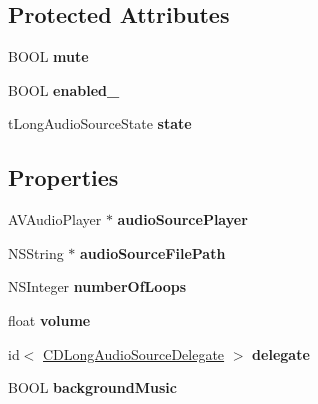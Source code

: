 \subsection*{Protected Attributes}
\begin{DoxyCompactItemize}
\item 
\hypertarget{interface_c_d_long_audio_source_a3402e241a03e28234bb22bb6ab6aad87}{B\-O\-O\-L {\bfseries mute}}\label{interface_c_d_long_audio_source_a3402e241a03e28234bb22bb6ab6aad87}

\item 
\hypertarget{interface_c_d_long_audio_source_af7bd033921e1c38c24c767ced5f4ca3e}{B\-O\-O\-L {\bfseries enabled\-\_\-}}\label{interface_c_d_long_audio_source_af7bd033921e1c38c24c767ced5f4ca3e}

\item 
\hypertarget{interface_c_d_long_audio_source_a40c0707fa345c90af619984ad6262f0c}{t\-Long\-Audio\-Source\-State {\bfseries state}}\label{interface_c_d_long_audio_source_a40c0707fa345c90af619984ad6262f0c}

\end{DoxyCompactItemize}
\subsection*{Properties}
\begin{DoxyCompactItemize}
\item 
\hypertarget{interface_c_d_long_audio_source_a286b94077fd473f116bece1d84189c80}{A\-V\-Audio\-Player $\ast$ {\bfseries audio\-Source\-Player}}\label{interface_c_d_long_audio_source_a286b94077fd473f116bece1d84189c80}

\item 
\hypertarget{interface_c_d_long_audio_source_a04f4635df6e90a7f2f3b7a571a9c43cf}{N\-S\-String $\ast$ {\bfseries audio\-Source\-File\-Path}}\label{interface_c_d_long_audio_source_a04f4635df6e90a7f2f3b7a571a9c43cf}

\item 
\hypertarget{interface_c_d_long_audio_source_a46736092910939328b9b4aabb43b25a5}{N\-S\-Integer {\bfseries number\-Of\-Loops}}\label{interface_c_d_long_audio_source_a46736092910939328b9b4aabb43b25a5}

\item 
\hypertarget{interface_c_d_long_audio_source_a4fb558153e158b558e9e32072dfb246b}{float {\bfseries volume}}\label{interface_c_d_long_audio_source_a4fb558153e158b558e9e32072dfb246b}

\item 
\hypertarget{interface_c_d_long_audio_source_a690db0af7c17d28ca88a7103f8c99cad}{id$<$ \hyperlink{protocol_c_d_long_audio_source_delegate-p}{C\-D\-Long\-Audio\-Source\-Delegate} $>$ {\bfseries delegate}}\label{interface_c_d_long_audio_source_a690db0af7c17d28ca88a7103f8c99cad}

\item 
\hypertarget{interface_c_d_long_audio_source_afcc5b159e3dd6feb30ab6de9c331ea11}{B\-O\-O\-L {\bfseries background\-Music}}\label{interface_c_d_long_audio_source_afcc5b159e3dd6feb30ab6de9c331ea11}

\end{DoxyCompactItemize}


